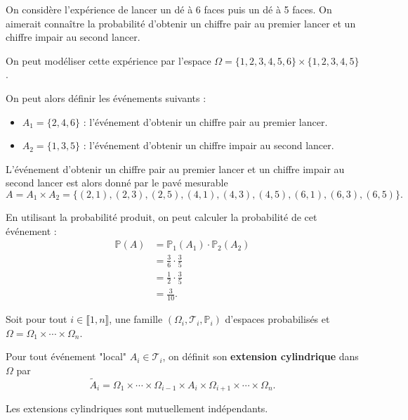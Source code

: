 \documentclass[a4paper, 12pt]{article}
\begin{document}
\begin{exemple}
    On considère l'expérience de lancer un dé à 6 faces puis un dé à 5 faces. On aimerait connaître la probabilité d'obtenir un chiffre pair au premier lancer et un chiffre impair au second lancer.

    On peut modéliser cette expérience par l'espace $\Omega = \{1, 2, 3, 4, 5, 6\} \times \{1, 2, 3, 4, 5\}$.

    On peut alors définir les événements suivants :
    \begin{itemize}
        \item $A_1 = \{2, 4, 6\}$ : l'événement d'obtenir un chiffre pair au premier lancer.
        \item $A_2 = \{1, 3, 5\}$ : l'événement d'obtenir un chiffre impair au second lancer.
    \end{itemize}
    L'événement d'obtenir un chiffre pair au premier lancer et un chiffre impair au second lancer est alors donné par le pavé mesurable
    $$
    A = A_1 \times A_2 = \{(2, 1), (2, 3), (2, 5), (4, 1), (4, 3), (4, 5), (6, 1), (6, 3), (6, 5)\}.
    $$

    En utilisant la probabilité produit, on peut calculer la probabilité de cet événement :
    \begin{align*}
    \mathbb{P}(A) &= \mathbb{P}_1(A_1) \cdot \mathbb{P}_2(A_2) \\
    &= \frac{3}{6} \cdot \frac{3}{5} \\
    &= \frac{1}{2} \cdot \frac{3}{5} \\
    &= \frac{3}{10}.
    \end{align*}
\end{exemple}

\begin{definition}
    Soit pour tout $i \in \llbracket 1, n \rrbracket$, une famille $(\Omega_i, \mathcal{T}_i, \mathbb{P}_i)$ d'espaces probabilisés et
    $\Omega = \Omega_1 \times \cdots \times \Omega_n$.

    Pour tout événement "local" $A_i \in \mathcal{T}_i$, on définit son \textbf{extension cylindrique} dans $\Omega$ par
    $$
    \tilde{A}_i = \Omega_1 \times \cdots \times \Omega_{i-1} \times A_i \times \Omega_{i+1} \times \cdots \times \Omega_n.
    $$
\end{definition}

\begin{proposition}{}{}
    Les extensions cylindriques sont mutuellement indépendants.
\end{proposition}
\end{document}
